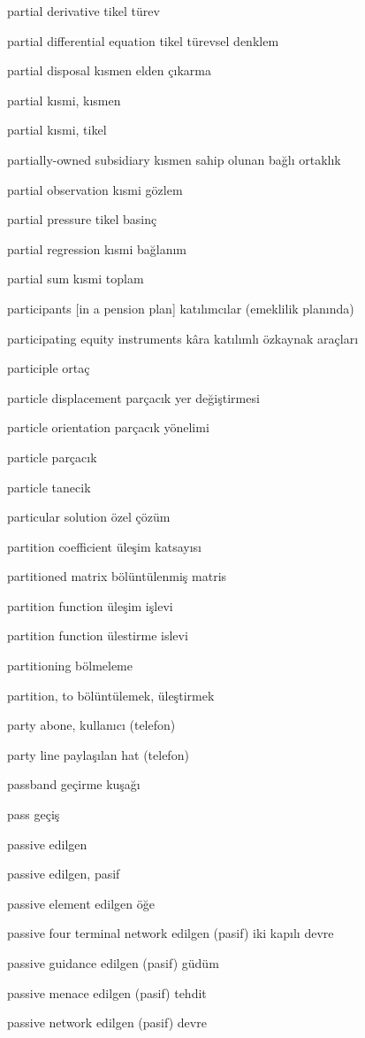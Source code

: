 \documentclass[12pt,fleqn]{article}\usepackage{../../common}
\begin{document}
partial derivative tikel türev

partial differential equation tikel türevsel denklem

partial disposal kısmen elden çıkarma

partial kısmi, kısmen

partial kısmi, tikel

partially-owned subsidiary kısmen sahip olunan bağlı ortaklık

partial observation kısmi gözlem

partial pressure tikel basinç

partial regression kısmi bağlanım

partial sum kısmi toplam

participants [in a pension plan] katılımcılar (emeklilik planında)

participating equity instruments kâra katılımlı özkaynak araçları

participle ortaç

particle displacement parçacık yer değiştirmesi

particle orientation parçacık yönelimi

particle parçacık

particle tanecik

particular solution özel çözüm

partition coefficient üleşim katsayısı

partitioned matrix bölüntülenmiş matris

partition function üleşim işlevi

partition function ülestirme islevi

partitioning bölmeleme

partition, to bölüntülemek, üleştirmek

party abone, kullanıcı (telefon)

party line paylaşılan hat (telefon)

passband geçirme kuşağı

pass geçiş

passive edilgen

passive edilgen, pasif

passive element edilgen öğe

passive four terminal network edilgen (pasif) iki kapılı devre

passive guidance edilgen (pasif) güdüm

passive menace edilgen (pasif) tehdit

passive network edilgen (pasif) devre
\end{document}
